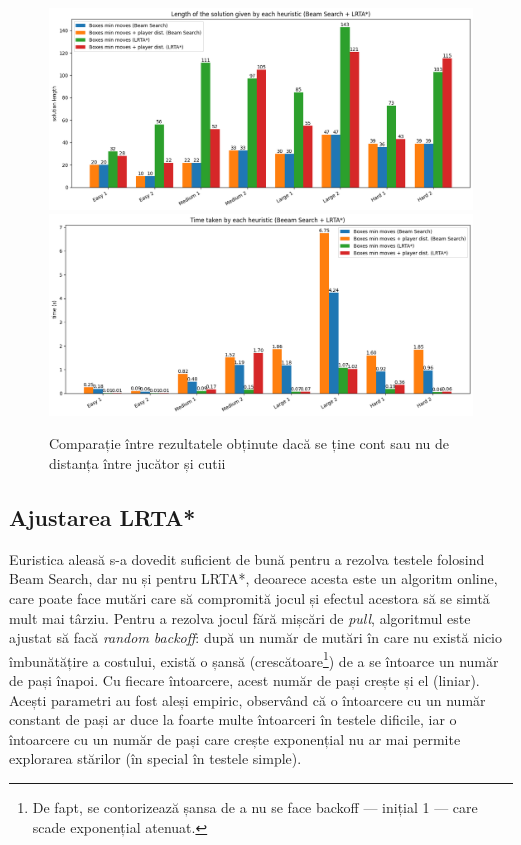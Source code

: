 \documentclass{article}
\begin{document}
\begin{figure}[ht]
    \begin{center}
        \includegraphics[scale=0.45]{comparison/solution_length.png}
        \includegraphics[scale=0.45]{comparison/time.png}
    \end{center}

    \caption{Comparație între rezultatele obținute dacă se ține cont sau nu de 
    distanța între jucător și cutii}
    \label{fig:comparison}
\end{figure}

\subsection{Ajustarea LRTA*}
Euristica aleasă s-a dovedit suficient de bună pentru a rezolva testele 
folosind Beam Search, dar nu și pentru LRTA*, deoarece acesta este un algoritm 
online, care poate face mutări care să compromită jocul și efectul acestora să
se simtă mult mai târziu. Pentru a rezolva jocul fără mișcări de \textit{pull},
algoritmul este ajustat să facă \textit{random backoff}: după un număr de mutări
în care nu există nicio îmbunătățire a costului, există o șansă 
(crescătoare\footnote{De fapt, se contorizează șansa de a nu se face backoff --- 
inițial 1 --- care scade exponențial atenuat.}) de a se întoarce un număr de 
pași înapoi. Cu fiecare întoarcere, acest număr de pași crește și el (liniar). 
Acești parametri au fost aleși empiric, observând că o întoarcere cu un număr 
constant de pași ar duce la foarte multe întoarceri în testele dificile, iar o 
întoarcere cu un număr de pași care crește exponențial nu ar mai permite 
explorarea stărilor (în special în testele simple).
\end{document}
